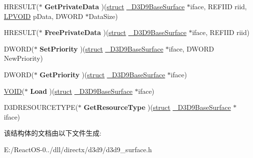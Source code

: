 \begin{DoxyCompactItemize}
\item 
\mbox{\label{struct___d3_d9_base_surface_vtbl_a855f4a2f5c0f65a031dbf1c6314e4e3a}} 
H\+R\+E\+S\+U\+LT($\ast$ {\bfseries Get\+Private\+Data} )(\hyperlink{interfacestruct}{struct} \hyperlink{struct___d3_d9_base_surface}{\+\_\+\+D3\+D9\+Base\+Surface} $\ast$iface, R\+E\+F\+I\+ID riid, \hyperlink{interfacevoid}{L\+P\+V\+O\+ID} p\+Data, D\+W\+O\+RD $\ast$Data\+Size)
\item 
\mbox{\label{struct___d3_d9_base_surface_vtbl_a1f93a5576fa0154af9852e4a8d13d61d}} 
H\+R\+E\+S\+U\+LT($\ast$ {\bfseries Free\+Private\+Data} )(\hyperlink{interfacestruct}{struct} \hyperlink{struct___d3_d9_base_surface}{\+\_\+\+D3\+D9\+Base\+Surface} $\ast$iface, R\+E\+F\+I\+ID riid)
\item 
\mbox{\label{struct___d3_d9_base_surface_vtbl_a3eacfcb6de66af2b7a1c5d85d693e1bc}} 
D\+W\+O\+RD($\ast$ {\bfseries Set\+Priority} )(\hyperlink{interfacestruct}{struct} \hyperlink{struct___d3_d9_base_surface}{\+\_\+\+D3\+D9\+Base\+Surface} $\ast$iface, D\+W\+O\+RD New\+Priority)
\item 
\mbox{\label{struct___d3_d9_base_surface_vtbl_a22d63d3f83814d1ed8cd596818c8d966}} 
D\+W\+O\+RD($\ast$ {\bfseries Get\+Priority} )(\hyperlink{interfacestruct}{struct} \hyperlink{struct___d3_d9_base_surface}{\+\_\+\+D3\+D9\+Base\+Surface} $\ast$iface)
\item 
\mbox{\label{struct___d3_d9_base_surface_vtbl_a97970eb8b30e49b7c99cbb7ca0277459}} 
\hyperlink{interfacevoid}{V\+O\+ID}($\ast$ {\bfseries Load} )(\hyperlink{interfacestruct}{struct} \hyperlink{struct___d3_d9_base_surface}{\+\_\+\+D3\+D9\+Base\+Surface} $\ast$iface)
\item 
\mbox{\label{struct___d3_d9_base_surface_vtbl_a5312972ad63ba9b1d6b3d175e61c9590}} 
D3\+D\+R\+E\+S\+O\+U\+R\+C\+E\+T\+Y\+PE($\ast$ {\bfseries Get\+Resource\+Type} )(\hyperlink{interfacestruct}{struct} \hyperlink{struct___d3_d9_base_surface}{\+\_\+\+D3\+D9\+Base\+Surface} $\ast$iface)
\end{DoxyCompactItemize}


该结构体的文档由以下文件生成\+:\begin{DoxyCompactItemize}
\item 
E\+:/\+React\+O\+S-\/0../dll/directx/d3d9/d3d9\+\_\+surface.\+h\end{DoxyCompactItemize}
